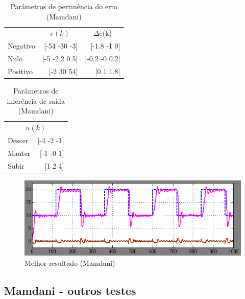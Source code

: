 \documentclass[
	twoside,				%
	twocolumn,				%
	english,				%
	brazil,					%
]{article}
\begin{document}

\begin{table}[!ht]
\caption{Parâmetros de pertinência do erro (Mamdani)}
\label{tab:pertinenceMamdani0}
\centering
\begin{tabular}{lrr}
\toprule
& \multicolumn{1}{c}{$e(k)$} & \multicolumn{1}{c}{$\Delta$e(k)} \\
\cmidrule(r){1-3}
Negativo & [-54 -30 -3] & [-1.8 -1 0] \\
Nulo & [-5 -2.2 0.5] & [-0.2 -0 0.2] \\
Positivo & [-2 30 54] & [0 1 1.8] \\
\bottomrule
\end{tabular}
\end{table}


\begin{table}[!ht]
\caption{Parâmetros de inferência de saída (Mamdani)}
\label{tab:inferenceMamdani0}
\centering
\begin{tabular}{lr}
\toprule
\multicolumn{2}{c}{$u(k)$} \\
\cmidrule(r){1-2}
Descer & [-4 -2 -1] \\
Manter & [-1 -0 1] \\
Subir & [1 2 4] \\
\bottomrule
\end{tabular}
\end{table}


\begin{figure}[!ht]
    \centering
    \includegraphics[width=\columnwidth]{mamdani1.png}
    \caption { Melhor resultado (Mamdani) }
	\label{fig:resultMamdani0}
\end{figure}


\subsection{Mamdani - outros testes}
\end{document}
